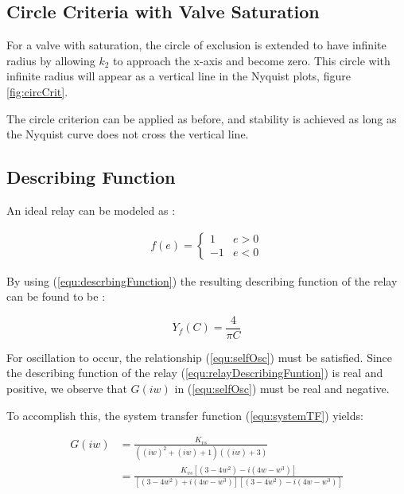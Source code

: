 \documentclass[a4paper, titlepage]{article}
\begin{document}
\subsection{Circle Criteria with Valve Saturation}

For a valve with saturation, the circle of exclusion is extended to have infinite radius by allowing $k_{2}$ to approach the x-axis and become zero.  This circle with infinite radius will appear as a vertical line in the Nyquist plots, figure \ref{fig:circCrit}.

The circle criterion can be applied as before, and stability is achieved as long as the Nyquist curve does not cross the vertical line.

\subsection{Describing Function}

An ideal relay can be modeled as \citep[p. 358]{glad00}:

\begin{equation}
\begin{split}
f(e) = \begin{cases}
1 & e > 0 \\
-1 & e <0
\end{cases}
\end{split}
\label{equ:relay}
\end{equation}

By using (\ref{equ:descrbingFunction}) the resulting describing function of the relay can be found to be \citep[P. 359]{glad00}:

\begin{equation}
Y_{f}(C) = \frac{4}{\pi C}
\label{equ:relayDescribingFuntion}
\end{equation}

For oscillation to occur, the relationship (\ref{equ:selfOsc}) must be satisfied.  Since the describing function of the relay (\ref{equ:relayDescribingFuntion}) is real and positive, we observe that $G(iw)$ in (\ref{equ:selfOsc}) must be real and negative.

To accomplish this, the system transfer function (\ref{equ:systemTF}) yields:

\begin{equation}
\begin{split}
G(iw) &= \frac{K_{vs}}{((iw)^2+(iw)+1)((iw)+3)}\\
&= \frac{K_{vs}[(3-4w^2)-i(4w-w^3)]}{[(3-4w^2)+i(4w-w^3)][(3-4w^2)-i(4w-w^3)]}
\end{split}
\label{equ:systemTFiw}
\end{equation}
\end{document}
